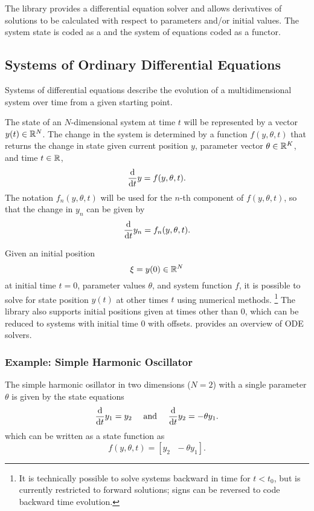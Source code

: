 \documentclass[10pt]{article}
\begin{document}
The  library provides a differential equation solver
and allows derivatives of solutions to be calculated with respect to
parameters and/or initial values.  The system state is coded as a
 and the system of equations coded as a functor.

\subsection{Systems of Ordinary Differential Equations}

Systems of differential equations describe the evolution of a
multidimensional system over time from a given starting point.  

The state of an $N$-dimensional system at time $t$ will be represented
by a vector $y(t) \in \mathbb{R}^N$. The change in the system is
determined by a function $f(y,\theta,t)$ that returns the change in
state given current position $y$, parameter vector $\theta \in
\mathbb{R}^K$, and time $t \in \mathbb{R}$,
\[
\frac{\mbox{d}}{\mbox{d} t} y = f(y,\theta,t).
\]
The notation $f_n(y,\theta,t)$ will be used for the $n$-th component
of $f(y,\theta,t)$, so that the change in $y_n$ can be given by
\[
\frac{\mbox{d}}{\mbox{d} t} y_n = f_n(y,\theta,t).
\]

Given an initial position 
\[
\xi = y(0) \in \mathbb{R}^N
\]
at initial time $t = 0$, parameter values $\theta$, and system
function $f$, it is possible to solve for state position $y(t)$ at
other times $t$ using numerical methods.%
%
\footnote{It is technically possible to solve systems backward in time
  for $t < t_0$, but  is currently restricted to
  forward solutions; signs can be reversed to code backward time
  evolution.}
%
The  library also supports initial positions given
at times other than 0, which can be reduced to systems with initial
time 0 with offsets.  \cite[Chapter~17]{PressEtAl:2007} provides an
overview of ODE solvers. 


\subsubsection{Example: Simple Harmonic Oscillator}

The simple harmonic osillator in two dimensions ($N = 2$) with a
single parameter $\theta$ is given by the state equations
\[
\frac{\mbox{d}}{\mbox{d} t} y_1 = y_2
\ \ \ \ \mbox{and} \ \ \ \
\frac{\mbox{d}}{\mbox{d} t} y_2 = -\theta y_1.
\]
%
which can be written as a state function as
\[
f(y,\theta,t) = [y_2 \ \ \ -\theta y_1].
\]
\end{document}
